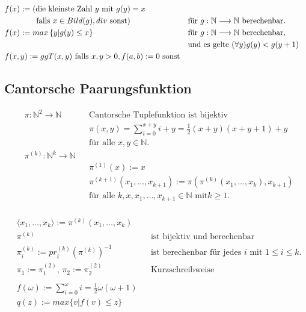 \documentclass[10pt,oneside,a4paper]{scrartcl}
\begin{document}
\begin{align}
    &f(x) := (\text{die kleinste Zahl $y$ mit $g(y) = x$}\nonumber\\
        &\hspace{13mm}\text{ falls $x\in Bild(g), div$ sonst} )
        && \text{für }g:\mathbb{N}\longrightarrow \mathbb{N}
           \text{ berechenbar.}\\
    &f(x) := max\left\{y | g(y) \leq x\right\}
        && \text{für }g:\mathbb{N}\longrightarrow \mathbb{N}
           \text{ berechenbar,}\nonumber\\
        &&& \text{und es gelte $(\forall y) g(y) < g(y+1)$}\\
    &f(x, y) := ggT(x, y) \text{ falls $x, y > 0, f(a, b) := 0$ sonst}
    \end{align}

    \subsection{Cantorsche Paarungsfunktion}

    \begin{align}
    &\pi : \mathbb{N}^2 \longrightarrow \mathbb{N}
            &&\text{Cantorsche Tuplefunktion ist bijektiv}\nonumber\\
            &&&\pi(x, y) = \sum^{x+y}_{i = 0} i+y =\frac{1}{2}(x+y)(x+y+1)+y\\
            &&&\text{für alle $x, y \in \mathbb{N}$.}\nonumber\\
    &\pi^{(k)} : \mathbb{N}^k \longrightarrow \mathbb{N}\nonumber &&\\
            &&&\pi^{(1)}(x) := x\nonumber\\
            &&&\pi^{(k+1)}(x_1, \ldots, x_{k+1}) :=
               \pi (\pi^{(k)}(x_1, \ldots, x_k), x_{k+1})\\
            &&&\text{für alle $k, x, x_1, \ldots, x_{k+1} \in \mathbb{N}$ mit}
               \text{$k \geq 1$.}\nonumber\\
    \end{align}


    \begin{align}
    &\langle x_1, \ldots, x_k\rangle := \pi^{(k)}(x_1, \ldots, x_k)\\
    &\pi^{(k)} && \text{ist bijektiv und berechenbar}\\
    &\pi_i^{(k)} := pr_i^{(k)}(\pi^{(k)})^{-1}
        && \text{ist berechenbar für jedes $i$ mit $1 \leq i \leq k$.}\\
    &\pi_1 := \pi_1^{(2)}\text{, }\pi_2 := \pi_2^{(2)}
        && \text{Kurzschreibweise}\nonumber\\
    \nonumber\\
    &f(\omega) := \sum_{i=0}^{\omega} i = \frac{1}{2} \omega (\omega+1)\\
    &q(z) := max\{v|f(v) \leq z\}
    \end{align}
\end{document}
